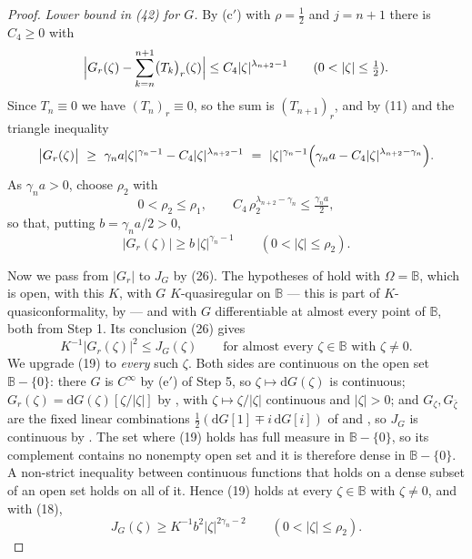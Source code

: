 \begin{proof}
\emph{Lower bound in (42) for $G$.}  By (c$'$) with $\rho=\tfrac12$ and
$j=n+1$ there is $C_4\ge0$ with
\[
  \Bigl|G_r(\zeta)-\sum_{k=n}^{n+1}\bigl(T_k\bigr)_r(\zeta)\Bigr|
  \le C_4|\zeta|^{\lambda_{n+2}-1}\qquad(0<|\zeta|\le\tfrac12).
\]
Since $T_n\equiv0$ we have $(T_n)_r\equiv0$, so the sum is $(T_{n+1})_r$, and
by (11) and the triangle inequality
\[
  \bigl|G_r(\zeta)\bigr|
  \ \ge\ \gamma_n a|\zeta|^{\gamma_n-1}-C_4|\zeta|^{\lambda_{n+2}-1}
  \ =\ |\zeta|^{\gamma_n-1}\Bigl(\gamma_na-C_4|\zeta|^{\lambda_{n+2}-\gamma_n}\Bigr).
\]
As $\gamma_na>0$, choose $\rho_2$ with
\begin{equation}\tag{17}
  0<\rho_2\le\rho_1,\qquad C_4\,\rho_2^{\lambda_{n+2}-\gamma_n}
  \le\tfrac{\gamma_na}{2},
\end{equation}
so that, putting $b=\gamma_na/2>0$,
\begin{equation}\tag{18}
  \bigl|G_r(\zeta)\bigr|\ge b\,|\zeta|^{\gamma_n-1}\qquad(0<|\zeta|\le\rho_2).
\end{equation}

Now we pass from $|G_r|$ to $J_G$ by (26).  The hypotheses of
 hold with $\Omega=\mathbb{B}$, which is open, with
this $K$, with $G$ $K$-quasiregular on $\mathbb{B}$ --- this is part of
$K$-quasiconformality, by  --- and with $G$
differentiable at almost every point of $\mathbb{B}$, both from Step 1.  Its conclusion (26) gives
\begin{equation}\tag{19}
  K^{-1}\bigl|G_r(\zeta)\bigr|^2\le J_G(\zeta)
  \qquad\text{for almost every }\zeta\in\mathbb{B}\text{ with }\zeta\neq0 .
\end{equation}
We upgrade (19) to \emph{every} such $\zeta$.  Both sides are continuous on the
open set $\mathbb{B}-\{0\}$: there $G$ is $C^\infty$ by (e$'$) of Step 5, so
$\zeta\mapsto\mathrm{d}G(\zeta)$ is continuous; $G_r(\zeta)
=\mathrm{d}G(\zeta)[\zeta/|\zeta|]$ by , with
$\zeta\mapsto\zeta/|\zeta|$ continuous and $|\zeta|>0$; and
$G_\zeta,G_{\bar\zeta}$ are the fixed linear combinations
$\tfrac12(\mathrm{d}G[1]\mp i\,\mathrm{d}G[i])$ of  and
, so $J_G$ is continuous by .  The set where (19)
holds has full measure in $\mathbb{B}-\{0\}$, so its complement contains no
nonempty open set and it is therefore dense in $\mathbb{B}-\{0\}$.  A
non-strict inequality between continuous functions that holds on a dense subset
of an open set holds on all of it.  Hence (19) holds at every
$\zeta\in\mathbb{B}$ with $\zeta\neq0$, and with (18),
\begin{equation}\tag{20}
  J_G(\zeta)\ge K^{-1}b^2|\zeta|^{2\gamma_n-2}\qquad(0<|\zeta|\le\rho_2).
\end{equation}


\end{proof}
